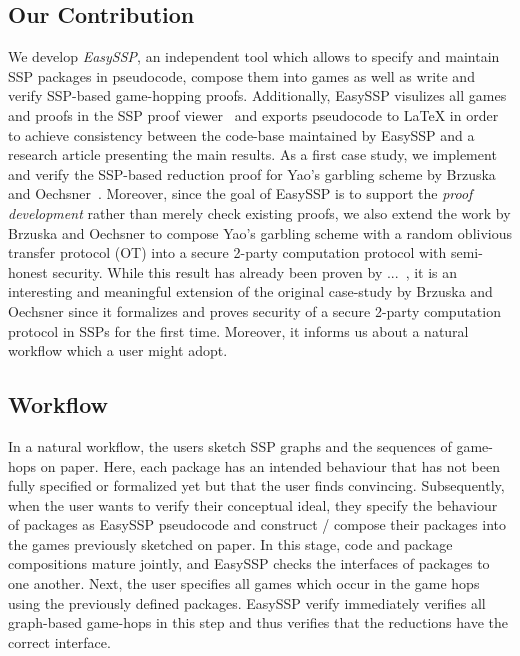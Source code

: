 \subsection{Our Contribution}
We develop \emph{EasySSP}, an independent tool which allows to specify and maintain
SSP packages in pseudocode, compose them into games as well as write and verify
SSP-based game-hopping proofs. Additionally, EasySSP visulizes all games and proofs in the SSP proof viewer~\cite{X} and exports pseudocode to LaTeX in order to achieve consistency between the code-base maintained by EasySSP and a research article
presenting the main results. As a first case study, we implement and verify the SSP-based reduction proof for Yao's garbling scheme by Brzuska and Oechsner~\cite{X}. Moreover, since the goal of EasySSP is to support the \emph{proof development} rather than merely check existing proofs, we also extend the work by Brzuska and Oechsner to compose Yao's garbling scheme with a random oblivious transfer protocol (OT) into a secure 2-party computation protocol with semi-honest security. While this result has already been proven by ...~\cite{X}, it is an interesting and meaningful extension of the original case-study by Brzuska and Oechsner since it formalizes and proves security of a secure 2-party computation protocol in SSPs for the first time. Moreover, it informs us about a natural workflow which a user might adopt.

\subsection{Workflow}
In a natural workflow, the users sketch SSP graphs and the sequences of game-hops
on paper. Here, each package has an intended behaviour that has not been fully
specified or formalized yet but that the user finds convincing. Subsequently, when
the user wants to verify their conceptual ideal, they specify the behaviour of packages
as EasySSP pseudocode and construct / compose their packages into the games previously sketched on paper. In this stage, code and package compositions mature jointly, and EasySSP checks the interfaces of packages to one another. Next, the user specifies all games which occur in the game hops using the previously defined packages.
EasySSP verify immediately verifies all graph-based game-hops in this step and thus verifies that the reductions have the correct interface.

